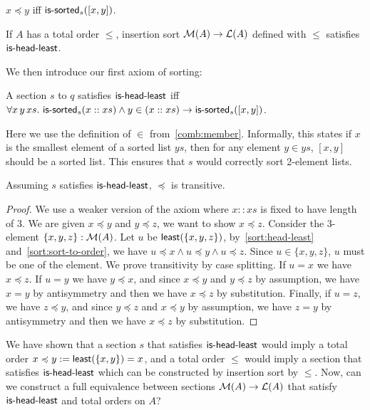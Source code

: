 \begin{proposition}\label{sort:sort-to-order}
    $x \preccurlyeq y$ iff $\operatorname{\mathsf{is-sorted}}_s([x, y])$.
\end{proposition}

\begin{proposition}
    If $A$ has a total order $\leq$, insertion sort $\mathcal{M}(A) \to \mathcal{L}(A)$ defined with $\leq$
    satisfies $\operatorname{\mathsf{is-head-least}}$.
\end{proposition}

\noindent
We then introduce our first axiom of sorting:
\begin{definition}\label{sort:head-least}
    A section $s$ to $q$ satisfies $\operatorname{\mathsf{is-head-least}}$ iff
    $\forall x\, y\, xs.\, \operatorname{\mathsf{is-sorted}}_s(x :: xs) \land y \in (x :: xs) \to \operatorname{\mathsf{is-sorted}}_s([x,y])$.
\end{definition}
Here we use the definition of $\in$ from~\ref{comb:member}. Informally, this states if
$x$ is the smallest element of a sorted list $ys$, then for any element $y \in ys$,
$[x, y]$ should be a sorted list. This ensures that $s$ would correctly sort 2-element lists.

\begin{proposition}
    Assuming $s$ satisfies $\operatorname{\mathsf{is-head-least}}$, $\preccurlyeq$ is transitive.
\end{proposition}
\begin{proof}
    We use a weaker version of the axiom where $x :: xs$ is fixed to have length of 3.
    We are given $x \preccurlyeq y$ and $y \preccurlyeq z$, we want to show $x \preccurlyeq z$.
    Consider the 3-element $\{x,y,z\} : \mathcal{M}(A)$. Let $u$ be $\operatorname{\mathsf{least}}(\{x,y,z\})$,
    by~\ref{sort:head-least} and~\ref{sort:sort-to-order},
    we have $u \preccurlyeq x \land u \preccurlyeq y \land u \preccurlyeq z$.
    Since $u \in \{x,y,z\}$, $u$ must be one of the element. We prove transitivity by case splitting.
    If $u = x$ we have $x \preccurlyeq z$. If $u = y$ we have $y \preccurlyeq x$, and since
    $x \preccurlyeq y$ and $y \preccurlyeq z$ by assumption,
    we have $x = y$ by antisymmetry and then we have $x \preccurlyeq z$ by substitution.
    Finally, if $u = z$, we have $z \preccurlyeq y$, and since
    $y \preccurlyeq z$ and $x \preccurlyeq y$ by assumption,
    we have $z = y$ by antisymmetry and then we have $x \preccurlyeq z$ by substitution.
\end{proof}

We have shown that a section $s$ that satisfies $\operatorname{\mathsf{is-head-least}}$ would imply a total order
$x \preccurlyeq y := \operatorname{\mathsf{least}}(\{x, y\}) = x$,
and a total order $\leq$ would imply a section that satisfies $\operatorname{\mathsf{is-head-least}}$ which can
be constructed by insertion sort by $\leq$. Now, can we construct a full equivalence
between sections $\mathcal{M}(A) \to \mathcal{L}(A)$ that satisfy $\operatorname{\mathsf{is-head-least}}$ and total orders on $A$?

